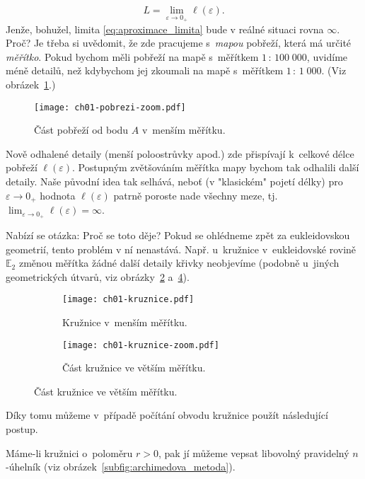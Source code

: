 \begin{equation}\label{eq:aproximace_limita}
    L=\lim_{\varepsilon\to0_+}{\ell(\varepsilon)}.
\end{equation}
Jenže, bohužel, limita \eqref{eq:aproximace_limita} bude v reálné situaci rovna $\infty$. Proč? Je třeba si uvědomit, že zde pracujeme s~\emph{mapou} pobřeží, která má určité \emph{měřítko}. Pokud bychom měli pobřeží na mapě s~měřítkem $1\,:\,100\;000$, uvidíme méně detailů, než kdybychom jej zkoumali na mapě s~měřítkem $1\,:\,1\;000$. (Viz obrázek~\ref{fig:pobrezi_zoom}.)\par
\begin{figure}[h]
    \centering
    \texttt{[image: ch01-pobrezi-zoom.pdf]}
    \caption{Část pobřeží od bodu $A$ v~menším měřítku.}
    \label{fig:pobrezi_zoom}
\end{figure}
Nově odhalené detaily (menší poloostrůvky apod.) zde přispívají k~celkové délce pobřeží $\ell(\varepsilon)$. Postupným zvětšováním měřítka mapy bychom tak odhalili další detaily. Naše původní idea tak selhává, neboť (v "klasickém" pojetí délky) pro $\varepsilon\to0_+$ hodnota $\ell(\varepsilon)$ patrně poroste nade všechny meze, tj. $\lim_{\varepsilon\to0_+}{\ell(\varepsilon)}=\infty$.\par
Nabízí se otázka: Proč se toto děje? Pokud se ohlédneme zpět za eukleidovskou geometrií, tento problém v ní nenastává. Např. u~kružnice v~eukleidovské rovině $\mathbb{E}_2$ změnou měřítka žádné další detaily křivky neobjevíme (podobně u~jiných geometrických útvarů, viz obrázky~\ref{subfig:kruznice} a~\ref{subfig:kruznice_zoom}). 
\begin{figure}[h]
    \centering
    \begin{subfigure}{\subfigwidth}
        \centering
        \texttt{[image: ch01-kruznice.pdf]}
        \caption{Kružnice v~menším měřítku.}
        \label{subfig:kruznice}
    \end{subfigure}
    \quad
    \begin{subfigure}{\subfigwidth}
        \centering
        \texttt{[image: ch01-kruznice-zoom.pdf]}
        \caption{Část kružnice ve větším měřítku.}
        \label{subfig:kruznice_zoom}
    \end{subfigure}
\end{figure}
Díky tomu můžeme v~případě počítání obvodu kružnice použít následující postup.\par
Máme-li kružnici o~poloměru $r>0$, pak jí můžeme vepsat libovolný pravidelný $n$-úhelník (viz obrázek~\ref{subfig:archimedova_metoda}).
